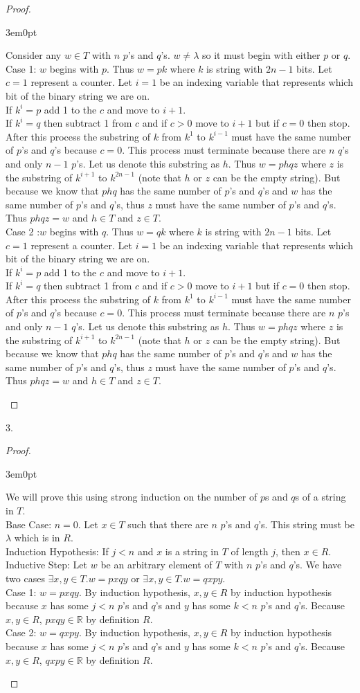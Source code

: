 \documentclass[11pt]{article}
\newcommand{\R}{\mathbb{R}}
\newcommand{\nskip}{\\ \bigskip}
\newenvironment{myproof}
{\begin{proof} \begin{adjustwidth}{3em}{0pt}$ $\par\nobreak\ignorespaces}
{\end{adjustwidth} \end{proof}}
\begin{document}
\begin{flushleft}
\begin{myproof}
Consider any $w \in T$ with $n$ $p$'s and $q$'s. $w \neq \lambda$ so it must begin with either $p$ or $q$. \nskip
Case 1: $w$ begins with $p$. Thus $w = pk$ where $k$ is string with $2n-1$ bits. Let $c=1$ represent a counter. Let $i = 1$ be an indexing variable that represents which bit of the binary string we are on. \nskip If $k^i = p$ add 1 to the $c$ and move to $i+1$.\\ If $k^i = q$  then subtract 1 from $c$ and if $c >0$ move to $i+1$ but if $c = 0$ then stop. \nskip After this process the substring of $k$ from $k^1$ to $k^{i-1}$ must have the same number of $p$'s and $q$'s because $c = 0$. This process must terminate because there are $n$ $q$'s and only $n-1$ $p$'s. Let us denote this substring as $h$. Thus $w = phqz$ where $z$ is the substring of $k^{i+1}$ to $k^{2n-1}$ (note that $h$ or $z$ can be the empty string). But because we know that $phq$ has the same number of $p$'s and $q$'s and $w$ has the same number of $p$'s and $q$'s, thus $z$ must have the same number of $p$'s and $q$'s. Thus $phqz = w$ and $h \in T$ and $z \in T$.\nskip
Case 2 :$w$ begins with $q$. Thus $w = qk$ where $k$ is string with $2n-1$ bits. Let $c=1$ represent a counter. Let $i = 1$ be an indexing variable that represents which bit of the binary string we are on. \nskip If $k^i = p$ add 1 to the $c$ and move to $i+1$. \\ If $k^i = q$ then subtract 1 from $c$ and if $c >0$ move to $i+1$ but if $c = 0$ then stop. \nskip After this process the substring of $k$ from $k^1$ to $k^{i-1}$ must have the same number of $p$'s and $q$'s because $c = 0$. This process must terminate because there are $n$ $p$'s and only $n-1$ $q$'s. Let us denote this substring as $h$. Thus $w = phqz$ where $z$ is the substring of $k^{i+1}$ to $k^{2n-1}$ (note that $h$ or $z$ can be the empty string). But because we know that $phq$ has the same number of $p$'s and $q$'s and $w$ has the same number of $p$'s and $q$'s, thus $z$ must have the same number of $p$'s and $q$'s. Thus $phqz = w$ and $h \in T$ and $z \in T$.
\end{myproof}

3.
\begin{myproof}
We will prove this using strong induction on the number of $p$s and $q$s of a string in $T$. \nskip
Base Case: $n = 0$. Let $x \in T$ such that there are $n$ $p$'s and $q$'s. This string must be $\lambda$ which is in $R$. \nskip
Induction Hypothesis: If $j < n$ and $x$ is a string in $T$ of length $j$, then $x \in R$. \nskip
Inductive Step: Let $w$ be an arbitrary element of $T$ with $n$ $p$'s and $q$'s. We have two cases $\exists x,y \in T.w = pxqy$ or $\exists x,y \in T. w = qxpy$. \nskip
Case 1: $w = pxqy$. By induction hypothesis, $x,y \in R$ by induction hypothesis because $x$ has some $j<n$ $p$'s and $q$'s and $y$ has some $k < n$ $p$'s and $q$'s. Because $x,y \in R$, $pxqy \in \R$ by definition $R$. \nskip
Case 2: $w = qxpy$. By induction hypothesis, $x,y \in R$ by induction hypothesis because $x$ has some $j<n$ $p$'s and $q$'s and $y$ has some $k < n$ $p$'s and $q$'s. Because $x,y \in R$, $qxpy \in \R$ by definition $R$.
\end{myproof}



\end{flushleft}
\end{document}
